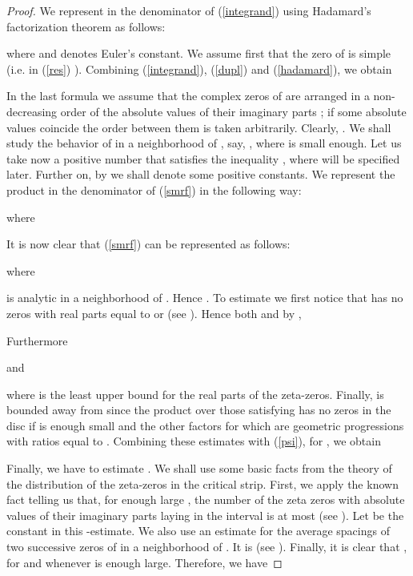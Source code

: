 \documentclass{article}
\begin{document}
\begin{proof}
 

   We represent  in the denominator of (\ref{integrand})
 using Hadamard's factorization theorem \cite[p.~30-31]{Titchmarsh86} as
 follows:
 
 where  and  denotes Euler's constant. We
 assume first that the zero   of  is simple
 (i.e. in (\ref{res}) ). Combining
 (\ref{integrand}), (\ref{dupl}) and (\ref{hadamard}), we obtain
 
 In the last formula we assume that the complex zeros  of
  are arranged in a non-decreasing order of the absolute
 values of their imaginary parts ; if
 some absolute values coincide the order between them is taken
 arbitrarily. Clearly, . We shall
 study the behavior of  in a neighborhood of ,
 say, , where  is small
 enough. Let us take now a positive number  that satisfies the
 inequality , where  will be
 specified later. Further on, by  we shall denote
 some positive constants. We represent the product in the
 denominator of (\ref{smrf}) in the following way:
 
 where
 
It is now clear that (\ref{smrf}) can be represented as follows:

 where

is analytic in a neighborhood of . Hence . To estimate  we first notice that
 has no zeros with real parts equal to  or  (see
\cite[p.~49]{Titchmarsh86}). 
Hence both 
and by \cite[Thm.\ 1.9, p.\ 25]{ivic2003},

Furthermore

and

where  is the least upper bound for the real parts of the
zeta-zeros. Finally,  is bounded away from 
since the product over those  satisfying  has no zeros in the disc  if
 is enough small and the other factors for which
 are geometric progressions with ratios
equal to . Combining these estimates with
(\ref{psi}), for , we obtain

Finally, we have to estimate .
We shall use some basic facts from the theory of the distribution
of the zeta-zeros in the critical strip. First, we apply the known
fact telling us that, for enough large , the number of the zeta
zeros with absolute values of their imaginary parts laying in the
interval  is at most  (see \cite[p.\ 211]{Titchmarsh86}). 
Let  be the constant in this -estimate. We also use
an estimate for the average spacings of two successive zeros of
 in a neighborhood of . It is  (see
\cite[pp.\ 214, 246]{Titchmarsh86}). Finally, it is clear that , for
 and  whenever
 is enough large. Therefore, we have


\end{proof}
\end{document}
